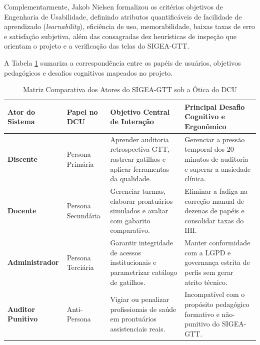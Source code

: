 Complementarmente, Jakob Nielsen \cite{nielsen1993, nielsen1994} formalizou os critérios objetivos de Engenharia de Usabilidade, definindo atributos quantificáveis de facilidade de aprendizado (\textit{learnability}), eficiência de uso, memorabilidade, baixas taxas de erro e satisfação subjetiva, além das consagradas dez heurísticas de inspeção que orientam o projeto e a verificação das telas do SIGEA-GTT.

A Tabela \ref{tab_comparativo_papeis_ucd} sumariza a correspondência entre os papéis de usuários, objetivos pedagógicos e desafios cognitivos mapeados no projeto.

\begin{table}[!ht]
\centering
\caption{Matriz Comparativa dos Atores do SIGEA-GTT sob a Ótica do DCU}
\label{tab_comparativo_papeis_ucd}
\footnotesize
\begin{tabularx}{\textwidth}{p{2.6cm} p{2.4cm} p{4.2cm} X}
\toprule
\textbf{Ator do Sistema} & \textbf{Papel no DCU} & \textbf{Objetivo Central de Interação} & \textbf{Principal Desafio Cognitivo e Ergonômico} \\
\midrule
\textbf{Discente} & Persona Primária & Aprender auditoria retrospectiva GTT, rastrear gatilhos e aplicar ferramentas da qualidade. & Gerenciar a pressão temporal dos 20 minutos de auditoria e superar a ansiedade clínica. \\
\addlinespace
\textbf{Docente} & Persona Secundária & Gerenciar turmas, elaborar prontuários simulados e avaliar com gabarito comparativo. & Eliminar a fadiga na correção manual de dezenas de papéis e consolidar taxas do IHI. \\
\addlinespace
\textbf{Administrador} & Persona Terciária & Garantir integridade de acessos institucionais e parametrizar catálogo de gatilhos. & Manter conformidade com a LGPD e governança estrita de perfis sem gerar atrito técnico. \\
\addlinespace
\textbf{Auditor Punitivo} & Anti-Persona & Vigiar ou penalizar profissionais de saúde em prontuários assistenciais reais. & Incompatível com o propósito pedagógico formativo e não-punitivo do SIGEA-GTT. \\
\bottomrule
\end{tabularx}
\end{table}
